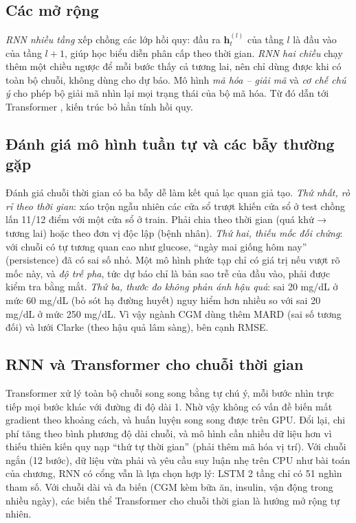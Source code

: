 \subsection{Các mở rộng}

\emph{RNN nhiều tầng} xếp chồng các lớp hồi quy: đầu ra $\mathbf h^{(l)}_t$ của tầng $l$ là đầu vào của tầng $l+1$, giúp học biểu diễn phân cấp theo thời gian. \emph{RNN hai chiều} chạy thêm một chiều ngược để mỗi bước thấy cả tương lai, nên chỉ dùng được khi có toàn bộ chuỗi, không dùng cho dự báo. Mô hình \emph{mã hóa – giải mã} \cite{sutskever2014} và \emph{cơ chế chú ý} \cite{bahdanau2015} cho phép bộ giải mã nhìn lại mọi trạng thái của bộ mã hóa. Từ đó dẫn tới Transformer \cite{vaswani2017}, kiến trúc bỏ hẳn tính hồi quy.

\subsection{Đánh giá mô hình tuần tự và các bẫy thường gặp}

Đánh giá chuỗi thời gian có ba bẫy dễ làm kết quả lạc quan giả tạo. \emph{Thứ nhất, rò rỉ theo thời gian}: xáo trộn ngẫu nhiên các cửa sổ trượt khiến cửa sổ ở test chồng lấn 11/12 điểm với một cửa sổ ở train. Phải chia theo thời gian (quá khứ → tương lai) hoặc theo đơn vị độc lập (bệnh nhân). \emph{Thứ hai, thiếu mốc đối chứng}: với chuỗi có tự tương quan cao như glucose, ``ngày mai giống hôm nay'' (persistence) đã có sai số nhỏ. Một mô hình phức tạp chỉ có giá trị nếu vượt rõ mốc này, và \emph{độ trễ pha}, tức dự báo chỉ là bản sao trễ của đầu vào, phải được kiểm tra bằng mắt. \emph{Thứ ba, thước đo không phản ánh hậu quả}: sai 20 mg/dL ở mức 60 mg/dL (bỏ sót hạ đường huyết) nguy hiểm hơn nhiều so với sai 20 mg/dL ở mức 250 mg/dL. Vì vậy ngành CGM dùng thêm MARD (sai số tương đối) và lưới Clarke (theo hậu quả lâm sàng), bên cạnh RMSE.

\subsection{RNN và Transformer cho chuỗi thời gian}

Transformer xử lý toàn bộ chuỗi song song bằng tự chú ý, mỗi bước nhìn trực tiếp mọi bước khác với đường đi độ dài 1. Nhờ vậy không có vấn đề biến mất gradient theo khoảng cách, và huấn luyện song song được trên GPU. Đổi lại, chi phí tăng theo bình phương độ dài chuỗi, và mô hình cần nhiều dữ liệu hơn vì thiếu thiên kiến quy nạp ``thứ tự thời gian'' (phải thêm mã hóa vị trí). Với chuỗi ngắn (12 bước), dữ liệu vừa phải và yêu cầu suy luận nhẹ trên CPU như bài toán của chương, RNN có cổng vẫn là lựa chọn hợp lý: LSTM 2 tầng chỉ có 51 nghìn tham số. Với chuỗi dài và đa biến (CGM kèm bữa ăn, insulin, vận động trong nhiều ngày), các biến thể Transformer cho chuỗi thời gian là hướng mở rộng tự nhiên.

